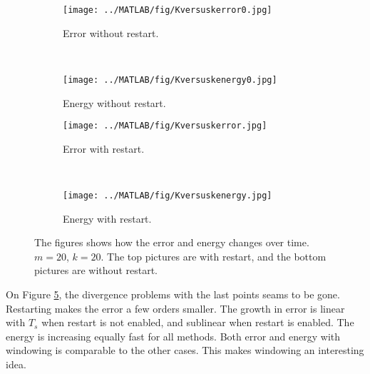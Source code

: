 \begin{figure}[H]
        \centering
        \begin{subfigure}[b]{0.3\textwidth}
                \texttt{[image: ../MATLAB/fig/Kversuskerror0.jpg]}
                \caption{ Error without restart. }
                \label{fig:Kversuskerror0}
        \end{subfigure}
		~
		\begin{subfigure}[b]{0.3\textwidth}
                \texttt{[image: ../MATLAB/fig/Kversuskenergy0.jpg]}
                \caption{ Energy without restart. }
                \label{fig:Kversuskenergy0}
        \end{subfigure}

        \begin{subfigure}[b]{0.3\textwidth}
                \texttt{[image: ../MATLAB/fig/Kversuskerror.jpg]}
                \caption{ Error with restart. }
                \label{fig:Kversuskerror}
        \end{subfigure}
		~
		\begin{subfigure}[b]{0.3\textwidth}
                \texttt{[image: ../MATLAB/fig/Kversuskenergy.jpg]}
                \caption{ Energy with restart. }
                \label{fig:Kversuskenergy}
        \end{subfigure}        
        
        \caption{ The figures shows how the error and energy changes over time. $m = 20$, $k= 20$. The top pictures are with restart, and the bottom pictures are without restart. }
        \label{fig:Kversusk}
\end{figure}
On Figure \ref{fig:Kversusk}, the divergence problems with the last points seams to be gone. Restarting makes the error a few orders smaller. The growth in error is linear with $T_s$ when restart is not enabled, and sublinear when restart is enabled. The energy is increasing equally fast for all methods.
Both error and energy with windowing is comparable to the other cases. This makes windowing an interesting idea.
